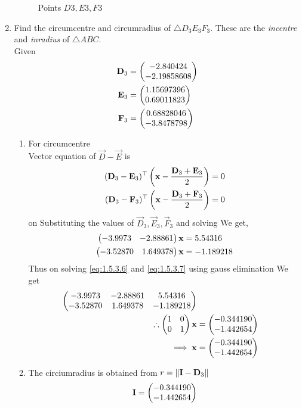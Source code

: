 \documentclass[11pt]{book}
\begin{document}
\begin{enumerate}[label=\thesection.\arabic*.,ref=\thesection.\theenumi]
\begin{figure}[H]
\caption{Points $D3,E3,F3$}
\label{fig:fig1}
\end{figure}
\item Find the circumcentre and circumradius of $\triangle D_3E_3F_3$.  These are the {\em incentre} and {\em inradius} of $\triangle ABC$. \\
\solution Given 
\begin{align}
    \mathbf{D}_3 &= \begin{pmatrix}-2.840424  \\ -2.19858608
    \end{pmatrix} \\
    \mathbf{E}_3 &= \begin{pmatrix}1.15697396  \\ 0.69011823\end{pmatrix} \\
    \mathbf{F}_3 &= \begin{pmatrix}0.68828046  \\ -3.8478798\end{pmatrix} 
\end{align}
\begin{enumerate}
\item For circumcentre \\
Vector equation of $\vec{D}-\vec{E}$ is
\begin{align}
(\mathbf{D}_3-\mathbf{E}_3)^\top\left( \mathbf{x} - \frac{\mathbf{D}_3+\mathbf{E}_3}{2}\right) = 0 \\
(\mathbf{D}_3-\mathbf{F}_3)^\top\left( \mathbf{x} - \frac{\mathbf{D}_3+\mathbf{F}_3}{2}\right) = 0
\end{align}
on Substituting the values of $\vec{D}_3, \vec{E}_3, \vec{F}_3$ and solving We get,
\begin{align}
 \myvec{-3.9973 & -2.88861}\vec{x} &= 5.54316 \label{eq:1.5.3.6} \\ 
 \myvec{-3.52870 & 1.649378}\vec{x} &= -1.189218 \label{eq:1.5.3.7}\\
\end{align}
Thus on solving \eqref{eq:1.5.3.6} and \eqref{eq:1.5.3.7} using gauss elimination We get
\begin{align}
    \begin{pmatrix} -3.9973 & -2.88861 & 5.54316 \\ -3.52870 & 1.649378 & -1.189218\end{pmatrix} \\
    \therefore \begin{pmatrix}1&0\\0&1\end{pmatrix}\mathbf{x} &= \begin{pmatrix}-0.344190 \\ -1.442654\end{pmatrix}\\
\implies \mathbf{x}&=\begin{pmatrix}-0.344190 \\ -1.442654\end{pmatrix}
\end{align}
\item The circiumradius is obtained from  $ r=\left\lVert\mathbf{I}-\mathbf{D}_3\right\rVert$
   \begin{align}
       \vec{I} &= \myvec{-0.344190 \\ -1.442654} \\

\end{align}
\end{enumerate}
\end{enumerate}
\end{document}
